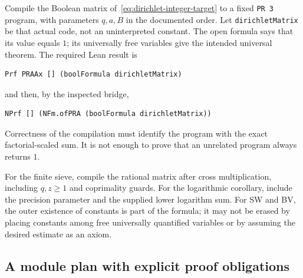 Compile the Boolean matrix of~\eqref{eq:dirichlet-integer-target} to a fixed \texttt{PR 3} program, with parameters $q,a,B$ in the documented order. Let \texttt{dirichletMatrix} be that actual code, not an uninterpreted constant. The open formula says that its value equals $1$; its universally free variables give the intended universal theorem. The required Lean result is
\begin{lstlisting}
Prf PRAAx [] (boolFormula dirichletMatrix)
\end{lstlisting}
and then, by the inspected bridge,
\begin{lstlisting}
NPrf [] (NFm.ofPRA (boolFormula dirichletMatrix))
\end{lstlisting}
Correctness of the compilation must identify the program with the exact factorial-scaled sum. It is not enough to prove that an unrelated program always returns $1$.

For the finite sieve, compile the rational matrix after cross multiplication, including $q,z\geq1$ and coprimality guards. For the logarithmic corollary, include the precision parameter and the supplied lower logarithm sum. For SW and BV, the outer existence of constants is part of the formula; it may not be erased by placing constants among free universally quantified variables or by assuming the desired estimate as an axiom.

\subsection{A module plan with explicit proof obligations}


